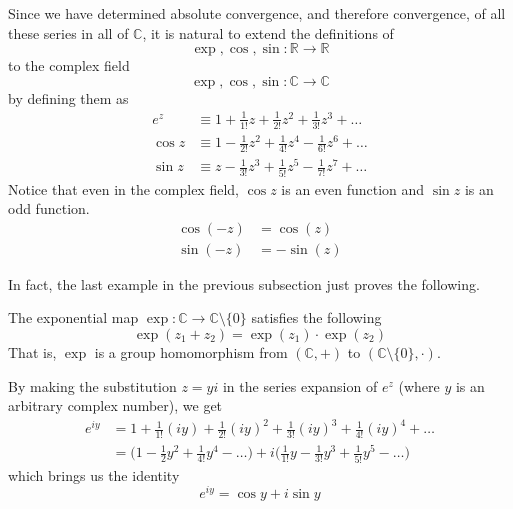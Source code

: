 \documentclass{article}
\begin{document}
      \begin{definition}
        Since we have determined absolute convergence, and therefore convergence, of all these series in all of $\mathbb{C}$, it is natural to extend the definitions of 
        \[\exp, \cos, \sin: \mathbb{R} \longrightarrow \mathbb{R}\]
        to the complex field 
        \[\exp, \cos, \sin: \mathbb{C} \longrightarrow \mathbb{C}\]
        by defining them as 
        \begin{align*}
            e^z & \equiv 1 + \frac{1}{1!}z + \frac{1}{2!} z^2 + \frac{1}{3!} z^3 + \ldots \\
            \cos{z} & \equiv 1 - \frac{1}{2!} z^2 + \frac{1}{4!} z^4 - \frac{1}{6!} z^6 + \ldots \\
            \sin{z} & \equiv z - \frac{1}{3!} z^3 + \frac{1}{5!} z^5 - \frac{1}{7!} z^7 + \ldots
        \end{align*}
        Notice that even in the complex field, $\cos{z}$ is an even function and $\sin{z}$ is an odd function. 
        \begin{align*}
            \cos(-z) & = \cos(z) \\
            \sin(-z) & = -\sin(z)
        \end{align*}
      \end{definition}

      In fact, the last example in the previous subsection just proves the following. 

      \begin{lemma}
        The exponential map $\exp: \mathbb{C} \longrightarrow \mathbb{C}\setminus \{0\}$ satisfies the following
        \[\exp(z_1 + z_2) = \exp(z_1) \cdot \exp (z_2)\]
        That is, $\exp$ is a group homomorphism from $(\mathbb{C}, +)$ to $(\mathbb{C} \setminus \{0\}, \cdot)$. 
      \end{lemma}

      \begin{definition}
        By making the substitution $z = yi$ in the series expansion of $e^z$ (where $y$ is an arbitrary complex number), we get 
        \begin{align*}
            e^{iy} & = 1 + \frac{1}{1!} (iy) + \frac{1}{2!}(iy)^2 + \frac{1}{3!} (iy)^3 + \frac{1}{4!} (iy)^4 + \ldots \\
            & = \bigg(1 - \frac{1}{2} y^2 + \frac{1}{4!} y^4 - \ldots \bigg) + i \bigg(\frac{1}{1!} y - \frac{1}{3!} y^3 + \frac{1}{5!} y^5 - \ldots \bigg)
        \end{align*}
        which brings us the identity
        \[e^{iy} = \cos{y} + i \sin{y}\]
      \end{definition}
\end{document}
